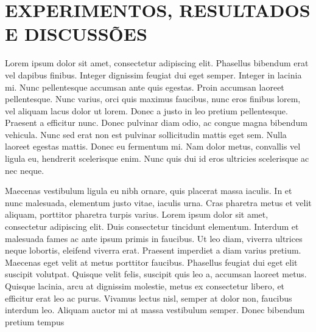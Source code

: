 \chapter{EXPERIMENTOS, RESULTADOS E DISCUSSÕES}\label{ch:experimentos}

Lorem ipsum dolor sit amet, consectetur adipiscing elit. Phasellus bibendum erat vel dapibus finibus. Integer dignissim feugiat dui eget semper. Integer in lacinia mi. Nunc pellentesque accumsan ante quis egestas. Proin accumsan laoreet pellentesque. Nunc varius, orci quis maximus faucibus, nunc eros finibus lorem, vel aliquam lacus dolor ut lorem. Donec a justo in leo pretium pellentesque. Praesent a efficitur nunc. Donec pulvinar diam odio, ac congue magna bibendum vehicula. Nunc sed erat non est pulvinar sollicitudin mattis eget sem. Nulla laoreet egestas mattis. Donec eu fermentum mi. Nam dolor metus, convallis vel ligula eu, hendrerit scelerisque enim. Nunc quis dui id eros ultricies scelerisque ac nec neque.

Maecenas vestibulum ligula eu nibh ornare, quis placerat massa iaculis. In et nunc malesuada, elementum justo vitae, iaculis urna. Cras pharetra metus et velit aliquam, porttitor pharetra turpis varius. Lorem ipsum dolor sit amet, consectetur adipiscing elit. Duis consectetur tincidunt elementum. Interdum et malesuada fames ac ante ipsum primis in faucibus. Ut leo diam, viverra ultrices neque lobortis, eleifend viverra erat. Praesent imperdiet a diam varius pretium. Maecenas eget velit at metus porttitor faucibus. Phasellus feugiat dui eget elit suscipit volutpat. Quisque velit felis, suscipit quis leo a, accumsan laoreet metus. Quisque lacinia, arcu at dignissim molestie, metus ex consectetur libero, et efficitur erat leo ac purus. Vivamus lectus nisl, semper at dolor non, faucibus interdum leo. Aliquam auctor mi at massa vestibulum semper. Donec bibendum pretium tempus